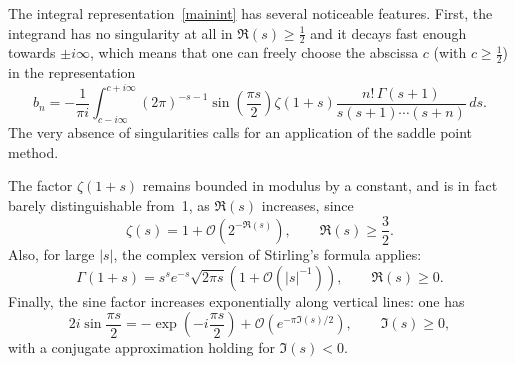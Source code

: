 \documentclass{amsart}
\begin{document}
The integral representation~\eqref{mainint} has several noticeable features. 
First, the integrand has no singularity at all in $\Re(s)\ge\frac12$
and it decays fast enough towards $\pm i \infty$,
which means that one can freely choose the abscissa $c$ (with $c\geq\frac12$)
in the representation 
\begin{equation}\label{mainint2}
b_n = -\frac{1}{\pi i} 
\int_{c-i\infty}^{c+i\infty} 
(2\pi)^{-s-1} \sin\left(\frac{\pi s}{2}\right)\zeta(1+s)
\frac{n!\, \Gamma(s+1)}{s(s+1)\cdots(s+n)}\, ds.
\end{equation}
The very absence of singularities calls for an application 
of the saddle  point method.

The factor $\zeta(1+s)$ remains bounded in modulus by a constant,
and is in fact barely distinguishable from~1, as $\Re(s)$ increases,
since
\begin{equation}\label{zetapp}
\zeta(s)=1+\mathcal{O}\left(2^{-\Re(s)}\right), \qquad \Re(s)\ge\frac32.
\end{equation}
Also, for large $|s|$, the complex version of Stirling's formula 
applies:
\begin{equation}\label{stirapp}
\Gamma(1+s) = s^s e^{-s}\sqrt{2\pi s}\left(1+\mathcal{O}(|s|^{-1})\right),\qquad \Re(s)\ge0.
\end{equation}
Finally, the sine factor increases exponentially along vertical lines:
one has
\begin{equation}\label{sinapp}
2i\sin\frac{\pi s}{2} =-\exp\left(-i\frac{\pi s}{2}\right)
+\mathcal{O}\left(e^{-\pi \Im(s)/2}\right), \qquad \Im(s)\ge0,
\end{equation}
with a conjugate approximation holding for $\Im(s)<0$.
\end{document}
